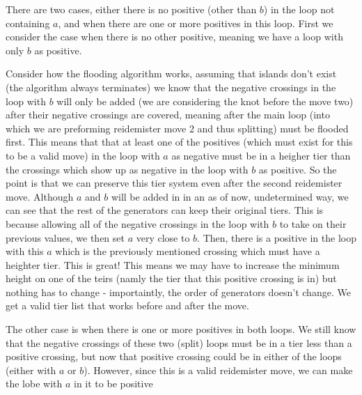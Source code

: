 \documentclass[11pt,oneside]{amsart}
\begin{document}
There are two cases, either there is no positive (other than $b$) in the loop not containing $a$, and when there are one or more positives in this loop. First we consider the case when there is no other positive, meaning we have a loop with only $b$ as positive. 

Consider how the flooding algorithm works, assuming that islands don't exist (the algorithm always terminates) we know that the negative crossings in the loop with $b$ will only be added (we are considering the knot before the move two) after their negative crossings are covered, meaning after the main loop (into which we are preforming reidemister move 2 and thus splitting) must be flooded first. This means that that at least one of the positives (which must exist for this to be a valid move) in the loop with $a$ as negative must be in a heigher tier than the crossings which show up as negative in the loop with $b$ as positive. So the point is that we can preserve this tier system even after the second reidemister move. Although $a$ and $b$ will be added in in an as of now, undetermined way, we can see that the rest of the generators can keep their original tiers. This is because allowing all of the negative crossings in the loop with $b$ to take on their previous values, we then set $a$ very close to $b$. Then, there is a positive in the loop with this $a$ which is the previously mentioned crossing which must have a heighter tier. This is great! This means we may have to increase the minimum height on one of the teirs (namly the tier that this positive crossing is in) but nothing has to change - importaintly, the order of generators doesn't change. We get a valid tier list that works before and after the move.

The other case is when there is one or more positives in both loops. We still know that the negative crossings of these two (split) loops must be in a tier less than a positive crossing, but now that positive crossing could be in either of the loops (either with $a$ or $b$). However, since this is a valid reidemister move, we can make the lobe with $a$ in it to be positive
\end{document}
